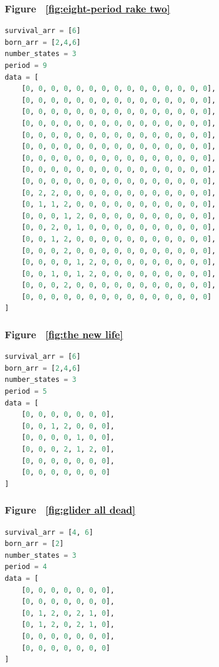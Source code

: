 \documentclass[12pt]{article}
\numberwithin{figure}{section} %
\begin{document}
\subsubsection{Figure ~\ref{fig:eight-period rake two}}
\label{subsubsection:eight-period rake two}
\begin{lstlisting}[language = Python]
survival_arr = [6]
born_arr = [2,4,6]
number_states = 3
period = 9
data = [
    [0, 0, 0, 0, 0, 0, 0, 0, 0, 0, 0, 0, 0, 0, 0],
    [0, 0, 0, 0, 0, 0, 0, 0, 0, 0, 0, 0, 0, 0, 0],
    [0, 0, 0, 0, 0, 0, 0, 0, 0, 0, 0, 0, 0, 0, 0],
    [0, 0, 0, 0, 0, 0, 0, 0, 0, 0, 0, 0, 0, 0, 0],
    [0, 0, 0, 0, 0, 0, 0, 0, 0, 0, 0, 0, 0, 0, 0],
    [0, 0, 0, 0, 0, 0, 0, 0, 0, 0, 0, 0, 0, 0, 0],
    [0, 0, 0, 0, 0, 0, 0, 0, 0, 0, 0, 0, 0, 0, 0],
    [0, 0, 0, 0, 0, 0, 0, 0, 0, 0, 0, 0, 0, 0, 0],
    [0, 0, 0, 0, 0, 0, 0, 0, 0, 0, 0, 0, 0, 0, 0],
    [0, 2, 2, 0, 0, 0, 0, 0, 0, 0, 0, 0, 0, 0, 0],
    [0, 1, 1, 2, 0, 0, 0, 0, 0, 0, 0, 0, 0, 0, 0],
    [0, 0, 0, 1, 2, 0, 0, 0, 0, 0, 0, 0, 0, 0, 0],
    [0, 0, 2, 0, 1, 0, 0, 0, 0, 0, 0, 0, 0, 0, 0],
    [0, 0, 1, 2, 0, 0, 0, 0, 0, 0, 0, 0, 0, 0, 0],
    [0, 0, 0, 2, 0, 0, 0, 0, 0, 0, 0, 0, 0, 0, 0],
    [0, 0, 0, 0, 1, 2, 0, 0, 0, 0, 0, 0, 0, 0, 0],
    [0, 0, 1, 0, 1, 2, 0, 0, 0, 0, 0, 0, 0, 0, 0],
    [0, 0, 0, 2, 0, 0, 0, 0, 0, 0, 0, 0, 0, 0, 0],
    [0, 0, 0, 0, 0, 0, 0, 0, 0, 0, 0, 0, 0, 0, 0]
]
\end{lstlisting}

\noindent\begin{minipage}{.45\textwidth}
\subsubsection{Figure ~\ref{fig:the new life}}
\label{subsubsection:the new life}
\begin{lstlisting}[language = Python]
survival_arr = [6]
born_arr = [2,4,6]
number_states = 3
period = 5
data = [
    [0, 0, 0, 0, 0, 0, 0],
    [0, 0, 1, 2, 0, 0, 0],
    [0, 0, 0, 0, 1, 0, 0],
    [0, 0, 0, 2, 1, 2, 0],
    [0, 0, 0, 0, 0, 0, 0],
    [0, 0, 0, 0, 0, 0, 0]
]
\end{lstlisting}
\end{minipage}\hfill
\begin{minipage}{.5\textwidth}
\subsubsection{Figure ~\ref{fig:glider all dead}}
\label{subsubsection:glider all dead}
\begin{lstlisting}[language = Python]
survival_arr = [4, 6]
born_arr = [2]
number_states = 3
period = 4
data = [
    [0, 0, 0, 0, 0, 0, 0],
    [0, 0, 0, 0, 0, 0, 0],
    [0, 1, 2, 0, 2, 1, 0],
    [0, 1, 2, 0, 2, 1, 0],
    [0, 0, 0, 0, 0, 0, 0],
    [0, 0, 0, 0, 0, 0, 0]
]
\end{lstlisting}
\end{minipage}
\end{document}
